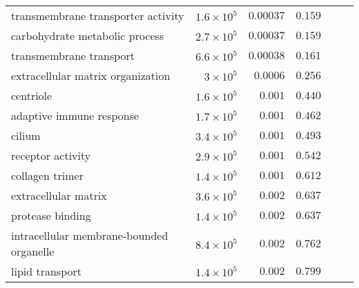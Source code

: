 \begin{longtable}{|l|r|r|r|r|r|}
       transmembrane transporter activity & $1.6\times 10^{5}$ &            $0.00037$ &                     $ 0.159~~$ \\
           carbohydrate metabolic process & $2.7\times 10^{5}$ &            $0.00037$ &                     $ 0.159~~$ \\
                  transmembrane transport & $6.6\times 10^{5}$ &            $0.00038$ &                     $ 0.161~~$ \\
        extracellular matrix organization &  $ 3\times 10^{5}$ &             $0.0006$ &                     $ 0.256~~$ \\
                                centriole & $1.6\times 10^{5}$ &             $ 0.001$ &                     $ 0.440~~$ \\
                 adaptive immune response & $1.7\times 10^{5}$ &             $ 0.001$ &                     $ 0.462~~$ \\
                                   cilium & $3.4\times 10^{5}$ &             $ 0.001$ &                     $ 0.493~~$ \\
                        receptor activity & $2.9\times 10^{5}$ &             $ 0.001$ &                     $ 0.542~~$ \\
                          collagen trimer & $1.4\times 10^{5}$ &             $ 0.001$ &                     $ 0.612~~$ \\
                     extracellular matrix & $3.6\times 10^{5}$ &             $ 0.002$ &                     $ 0.637~~$ \\
                         protease binding & $1.4\times 10^{5}$ &             $ 0.002$ &                     $ 0.637~~$ \\
 intracellular membrane-bounded organelle & $8.4\times 10^{5}$ &             $ 0.002$ &                     $ 0.762~~$ \\
                          lipid transport & $1.4\times 10^{5}$ &             $ 0.002$ &                     $ 0.799~~$ \\
\end{longtable}
